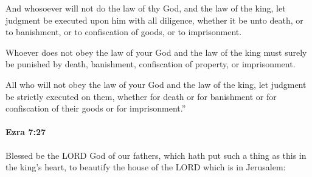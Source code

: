 			\begin{versebox}
					\item[BHS] 
					\item[LXX] 
					\item[ASV] And whosoever will not do the law of thy God, and the law of the king, let judgment be executed upon him with all diligence, whether it be unto death, or to banishment, or to confiscation of goods, or to imprisonment.
					\item[NIV] Whoever does not obey the law of your God and the law of the king must surely be punished by death, banishment, confiscation of property, or imprisonment.
					\item[NRSV] All who will not obey the law of your God and the law of the king, let judgment be strictly executed on them, whether for death or for banishment or for confiscation of their goods or for imprisonment.”
			\end{versebox}

		\paragraph{Ezra 7:27} %
			\label{EZRA-7-27}

			Blessed be the LORD God of our fathers, which hath put such a thing as this in the king’s heart, to beautify the house of the LORD which is in Jerusalem:


